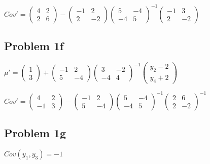 \documentclass[a4paper]{article}
\begin{document}
$Cov' = \begin{pmatrix} 4 & 2\\ 2 & 6 \end{pmatrix}-\begin{pmatrix} -1 & 2\\ 2 & -2 \end{pmatrix} \begin{pmatrix} 5 & -4\\ -4 & 5\end{pmatrix}^{-1}\begin{pmatrix}-1 & 3\\ 2 & -2 \end{pmatrix}$


\subsection*{Problem 1f}

$\mu' =  \begin{pmatrix} 1 \\3 \end{pmatrix} + \begin{pmatrix} -1 & 2\\ 5 &-4 \end{pmatrix}\begin{pmatrix} 3 & -2 \\-4 & 4\end{pmatrix}^{-1}\begin{pmatrix}y_2-2\\ y_4+2\end{pmatrix} $

$Cov' = \begin{pmatrix} 4 & 2\\ -1 & 3 \end{pmatrix} - \begin{pmatrix} -1 & 2\\ 5 &-4 \end{pmatrix}\begin{pmatrix} 5 & -4\\ -4 & 5\end{pmatrix}^{-1} \begin{pmatrix} 2 & 6\\ 2 & -2\end{pmatrix}^{-1} $




\subsection*{Problem 1g}
$Cov(y_1,y_3) = -1 $
\end{document}
